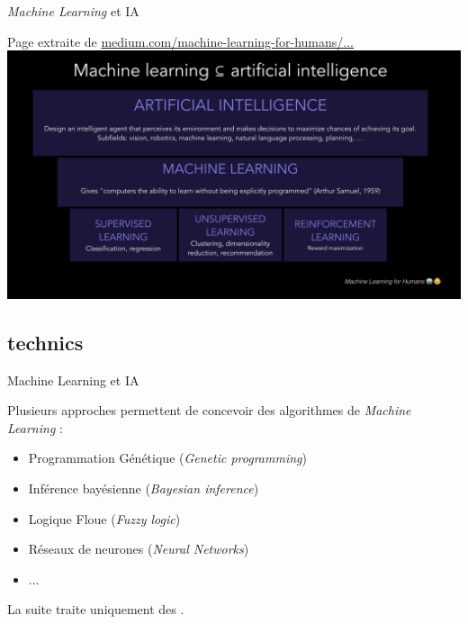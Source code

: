 \documentclass[10pt,serif,mathserif,compress,hyperref={colorlinks}]{beamer}
\begin{document}
\begin{frame}{{\em Machine Learning} et IA}

  {\small Page extraite de \href{https://medium.com/machine-learning-for-humans/why-machine-learning-matters-6164faf1df12}
  {medium.com/machine-learning-for-humans/...}}\\[2mm]
  
  \hspace*{-10mm}\includegraphics[width=1.2\textwidth]{images/AI-from_MachineLearningForHumans.png}
  \vspace*{-8mm}
  
\end{frame}

\subsection{technics}

\begin{frame}{Machine Learning et IA}


  Plusieurs approches permettent de concevoir des algorithmes de {\em Machine Learning} :
    \begin{itemize}
    \item Programmation Génétique ({\em Genetic programming})
    \item Inférence bayésienne ({\em Bayesian inference})
    \item Logique Floue ({\em Fuzzy logic})
    \item Réseaux de neurones ({\em Neural Networks})
    \item ...
    \end{itemize}    

    \bigskip
    \visible La suite traite uniquement des .
\end{frame}
\end{document}
